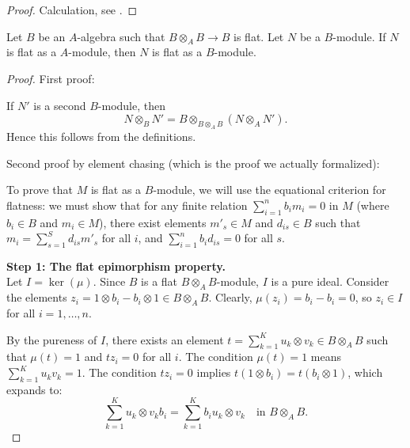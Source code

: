 \begin{proof}
    Calculation, see .
    \leanok
\end{proof}

\begin{lemma}[\stacksproject{092C}]
    Let $B$ be an $A$-algebra such that $B \otimes_{A} B \to B$ is flat. Let $N$ be a $B$-module.
    If $N$ is flat as a $A$-module, then $N$ is flat as a $B$-module.
    \label{lemma:weakly-etale-flat}
    \leanok
\end{lemma}

\begin{proof}
    \leanok
    First proof:

    If $N'$ is a second $B$-module, then
    \[
        N \otimes_B N' = B \otimes_{B \otimes_{A} B} (N \otimes_{A} N')
    .\]
    Hence this follows from the definitions.

    Second proof by element chasing (which is the proof we actually formalized):

    To prove that $M$ is flat as a $B$-module, we will use the equational criterion for flatness: we must show that for any finite relation $\sum_{i=1}^n b_i m_i = 0$ in $M$ (where $b_i \in B$ and $m_i \in M$), there exist elements $m'_s \in M$ and $d_{is} \in B$ such that $m_i = \sum_{s=1}^S d_{is} m'_s$ for all $i$, and $\sum_{i=1}^n b_i d_{is} = 0$ for all $s$.

    \medskip\noindent
    \textbf{Step 1: The flat epimorphism property.} \\
    Let $I = \ker(\mu)$. Since $B$ is a flat $B \otimes_A B$-module, $I$ is a pure ideal. Consider the elements $z_i = 1 \otimes b_i - b_i \otimes 1 \in B \otimes_A B$. Clearly, $\mu(z_i) = b_i - b_i = 0$, so $z_i \in I$ for all $i = 1, \dots, n$. 

    By the pureness of $I$, there exists an element $t = \sum_{k=1}^K u_k \otimes v_k \in B \otimes_A B$ such that $\mu(t) = 1$ and $t z_i = 0$ for all $i$. 
    The condition $\mu(t) = 1$ means $\sum_{k=1}^K u_k v_k = 1$. 
    The condition $t z_i = 0$ implies $t(1 \otimes b_i) = t(b_i \otimes 1)$, which expands to:
    \begin{equation} \label{eq:bump}
    \sum_{k=1}^K u_k \otimes v_k b_i = \sum_{k=1}^K b_i u_k \otimes v_k \quad \text{in } B \otimes_A B.
    \end{equation}


\end{proof}
